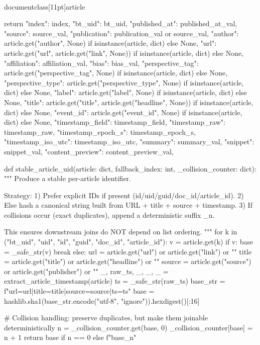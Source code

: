 \\documentclass[11pt]{article}
\begin{document}
\begin{CodeBlock}
    return {
        "index": index,
        "bt_uid": bt_uid,
        "published_at": published_at_val,
        "source": source_val,
        "publication": publication_val or source_val,
        "author": article.get("author", None) if isinstance(article, dict) else None,
        "url": article.get("url", article.get("link", None)) if isinstance(article, dict) else None,
        "affiliation": affiliation_val,
        "bias": bias_val,
        "perspective_tag": article.get("perspective_tag", None) if isinstance(article, dict) else None,
        "perspective_type": article.get("perspective_type", None) if isinstance(article, dict) else None,
        "label": article.get("label", None) if isinstance(article, dict) else None,
        "title": article.get("title", article.get("headline", None)) if isinstance(article, dict) else None,
        "event_id": article.get("event_id", None) if isinstance(article, dict) else None,
        "timestamp_field": timestamp_field,
        "timestamp_raw": timestamp_raw,
        "timestamp_epoch_s": timestamp_epoch_s,
        "timestamp_iso_utc": timestamp_iso_utc,
        "summary": summary_val,
        "snippet": snippet_val,
        "content_preview": content_preview_val,
    }


def stable_article_uid(article: dict, fallback_index: int, _collision_counter: dict):
    """
    Produce a stable per-article identifier.

    Strategy:
      1) Prefer explicit IDs if present (id/uid/guid/doc_id/article_id).
      2) Else hash a canonical string built from URL + title + source + timestamp.
      3) If collisions occur (exact duplicates), append a deterministic suffix _{n}.

    This ensures downstream joins do NOT depend on list ordering.
    """
    for k in ("bt_uid", "uid", "id", "guid", "doc_id", "article_id"):
        v = article.get(k)
        if v:
            base = _safe_str(v)
            break
    else:
        url = article.get("url") or article.get("link") or ""
        title = article.get("title") or article.get("headline") or ""
        source = article.get("source") or article.get("publisher") or ""
        _, raw_ts, _, _, _ = extract_article_timestamp(article)
        ts = _safe_str(raw_ts)
        base_str = f"url={url}|title={title}|source={source}|ts={ts}"
        base = hashlib.sha1(base_str.encode("utf-8", "ignore")).hexdigest()[:16]

    # Collision handling: preserve duplicates, but make them joinable deterministically
    n = _collision_counter.get(base, 0)
    _collision_counter[base] = n + 1
    return base if n == 0 else f"{base}_{n}"



\end{CodeBlock}
\end{document}
